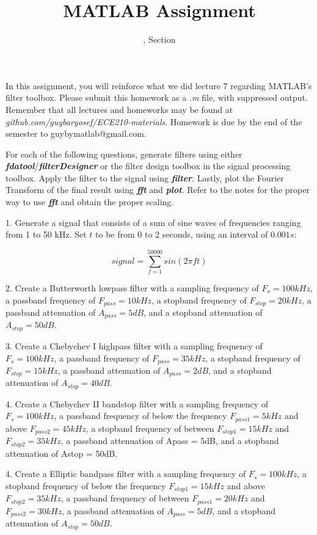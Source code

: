 \documentclass[11pt]{article}
\title{MATLAB Assignment \Homework}
\author{\Session, Section \Section}
\date{}
\makeatletter
\def\MyEmail{guybymatlab@gmail.com}
\makeatother
\begin{document}
\maketitle
In this assignment, you will reinforce what we did lecture 7
regarding MATLAB's filter toolbox.
Please submit this homework as a \textit{.m} file, 
with suppressed output.
Remember that all lectures and homeworks may be found at 
\textit{github.com/guybaryosef/ECE210-materials}.
Homework is due by the end of the semester to \MyEmail.

For each of the following questions,
generate filters using either \textbf{\textit{fdatool}}/\textbf{\textit{filterDesigner}}
 or the filter design toolbox in the signal processing toolbox.
Apply the filter to the signal using \textit{\textbf{filter}}.
Lastly, plot the Fourier Transform of the final result using \textit{\textbf{fft}} 
and \textit{\textbf{plot}}.
Refer to the notes for the proper way to use \textit{\textbf{fft}} and obtain the proper scaling.

1. Generate a signal that consists of a sum of sine waves of frequencies ranging from 1 to 50 kHz.
Set $t$ to be from 0 to 2 seconds, using an interval of $0.001s$:

$$ signal = \sum_{f=1}^{50000} sin(2\pi ft)$$

2. Create a Butterworth lowpass filter with a sampling frequency of $F_s = 100 kHz$,
a passband frequency of $F_{pass} = 10 kHz$, a stopband frequency of $F_{stop} = 20 kHz$,
a passband attenuation of $A_{pass} = 5dB$, and a stopband attenuation of $A_{stop} = 50dB$.

3. Create a Chebychev I highpass filter with a sampling frequency of $F_s = 100 kHz$,
a passband frequency of $F_{pass} = 35 kHz$, a stopband frequency of $F_{stop} = 15 kHz$,
a passband attenuation of $A_{pass} = 2dB$, and a stopband attenuation of $A_{stop} = 40dB$.

4. Create a Chebychev II bandstop filter with a sampling frequency of $F_s = 100 kHz$,
a passband frequency of below the frequency $F_{pass1} = 5 kHz$ and above $F_{pass2} = 45 kHz$,
a stopband frequency of between $F_{stop1} = 15 kHz$ and $F_{stop2} = 35kHz$,
a passband attenuation of Apass = 5dB, and a stopband attenuation of Astop = 50dB.

4. Create a Elliptic bandpass filter with a sampling frequency of $F_s = 100 kHz$,
a stopband frequency of below the frequency $F_{stop1} = 15 kHz$ and above $F_{stop2} = 35 kHz$,
a passband frequency of between $F_{pass1} = 20 kHz$ and $F_{pass2} = 30 kHz$,
a passband attenuation of $A_{pass} = 5dB$, and a stopband attenuation of $A_{stop} = 50dB$.
\end{document}
